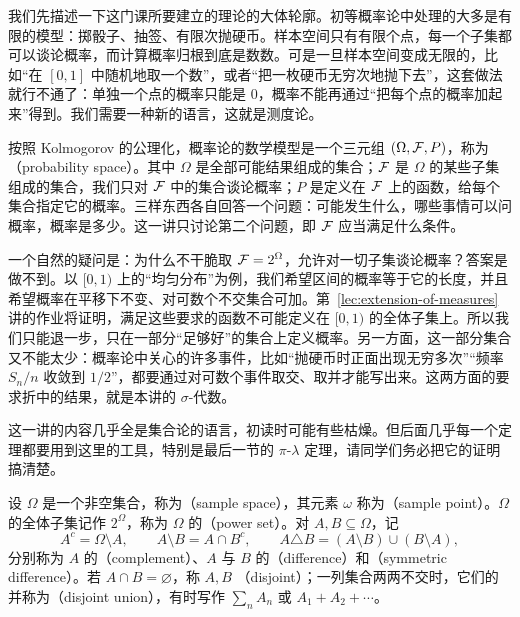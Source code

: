 \label{lec:set-systems}

我们先描述一下这门课所要建立的理论的大体轮廓。初等概率论中处理的大多是有限的模型：掷骰子、抽签、有限次抛硬币。样本空间只有有限个点，每一个子集都可以谈论概率，而计算概率归根到底是数数。可是一旦样本空间变成无限的，比如“在 $[0,1]$ 中随机地取一个数”，或者“把一枚硬币无穷次地抛下去”，这套做法就行不通了：单独一个点的概率只能是 $0$，概率不能再通过“把每个点的概率加起来”得到。我们需要一种新的语言，这就是测度论。

按照 Kolmogorov 的公理化，概率论的数学模型是一个三元组 $(\Omega,\mathcal{F},P)$，称为（probability space）。其中 $\Omega$ 是全部可能结果组成的集合；$\mathcal{F}$ 是 $\Omega$ 的某些子集组成的集合，我们只对 $\mathcal{F}$ 中的集合谈论概率；$P$ 是定义在 $\mathcal{F}$ 上的函数，给每个集合指定它的概率。三样东西各自回答一个问题：可能发生什么，哪些事情可以问概率，概率是多少。这一讲只讨论第二个问题，即 $\mathcal{F}$ 应当满足什么条件。

一个自然的疑问是：为什么不干脆取 $\mathcal{F}=2^\Omega$，允许对一切子集谈论概率？答案是做不到。以 $[0,1)$ 上的“均匀分布”为例，我们希望区间的概率等于它的长度，并且希望概率在平移下不变、对可数个不交集合可加。第~\ref{lec:extension-of-measures} 讲的作业将证明，满足这些要求的函数不可能定义在 $[0,1)$ 的全体子集上。所以我们只能退一步，只在一部分“足够好”的集合上定义概率。另一方面，这一部分集合又不能太少：概率论中关心的许多事件，比如“抛硬币时正面出现无穷多次”“频率 $S_n/n$ 收敛到 $1/2$”，都要通过对可数个事件取交、取并才能写出来。这两方面的要求折中的结果，就是本讲的 $\sigma$-代数。

这一讲的内容几乎全是集合论的语言，初读时可能有些枯燥。但后面几乎每一个定理都要用到这里的工具，特别是最后一节的 $\pi$-$\lambda$ 定理，请同学们务必把它的证明搞清楚。


设 $\Omega$ 是一个非空集合，称为（sample space），其元素 $\omega$ 称为（sample point）。$\Omega$ 的全体子集记作 $2^\Omega$，称为 $\Omega$ 的（power set）。对 $A,B\subseteq\Omega$，记
\[
A^c=\Omega\setminus A,\qquad A\setminus B=A\cap B^c,\qquad A\triangle B=(A\setminus B)\cup(B\setminus A),
\]
分别称为 $A$ 的（complement）、$A$ 与 $B$ 的（difference）和（symmetric difference）。若 $A\cap B=\varnothing$，称 $A,B$ （disjoint）；一列集合两两不交时，它们的并称为（disjoint union），有时写作 $\sum_n A_n$ 或 $A_1+A_2+\cdots$。

